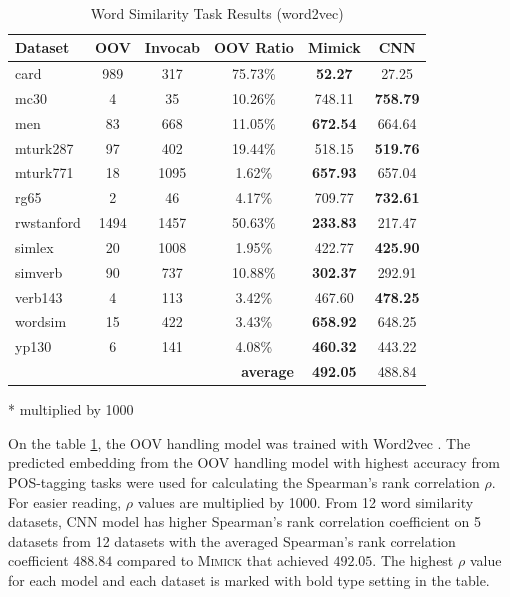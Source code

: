     \begin{table}[!ht]
      \begin{threeparttable} 
      \begin{center}
        \caption{Word Similarity Task Results (word2vec)}
        ~\\
        \label{tab:wordsim:word2vec}
        \begin{tabular}{l|c|c|c|c|c}
          \textbf{Dataset} & \textbf{OOV} & \textbf{Invocab} & \textbf{OOV Ratio} & \textbf{Mimick}\tnote{*} & \textbf{CNN}\tnote{*}\\
          \hline
          card & 989 & 317 & 75.73\% & \textbf{52.27} & 27.25\\
          mc30 & 4 & 35 & 10.26\% & 748.11 & \textbf{758.79}\\
          men & 83 & 668 & 11.05\% & \textbf{672.54} & 664.64\\
          mturk287 & 97 & 402 & 19.44\% & 518.15 & \textbf{519.76}\\
          mturk771 & 18 & 1095 & 1.62\% & \textbf{657.93} & 657.04\\
          rg65 & 2 & 46 & 4.17\% & 709.77 & \textbf{732.61}\\
          rwstanford & 1494 & 1457 & 50.63\% & \textbf{233.83} & 217.47\\
          simlex & 20 & 1008 & 1.95\% & 422.77 & \textbf{425.90}\\
          simverb & 90 & 737 & 10.88\% & \textbf{302.37} & 292.91\\
          verb143 & 4 & 113 & 3.42\% & 467.60 & \textbf{478.25}\\
          wordsim & 15 & 422 & 3.43\% & \textbf{658.92} & 648.25\\
          yp130 & 6 & 141 & 4.08\% & \textbf{460.32} & 443.22\\
          \hline
          \multicolumn{4}{r|}{\textbf{average}} & \textbf{492.05} & 488.84\\
        \end{tabular}
        \begin{tablenotes}
          \item[*] multiplied by 1000
        \end{tablenotes}
      \end{center}
      
    \end{threeparttable} 
    \end{table}
    On the table \ref{tab:wordsim:word2vec}, the OOV handling model
    was trained with Word2vec \citep{Distributed2013mikolov}. The
    predicted embedding from the OOV handling model with highest
    accuracy from POS-tagging tasks were used for calculating the
    Spearman's rank correlation $\rho$. For easier reading, $\rho$
    values are multiplied by 1000. From 12 word similarity datasets,
    CNN model has higher Spearman's rank correlation coefficient on 5
    datasets from 12 datasets with the averaged Spearman's rank
    correlation coefficient $488.84$ compared to \textsc{Mimick}
    that achieved $492.05$. The highest $\rho$ value for each model
    and each dataset is marked with bold type setting in the table.

